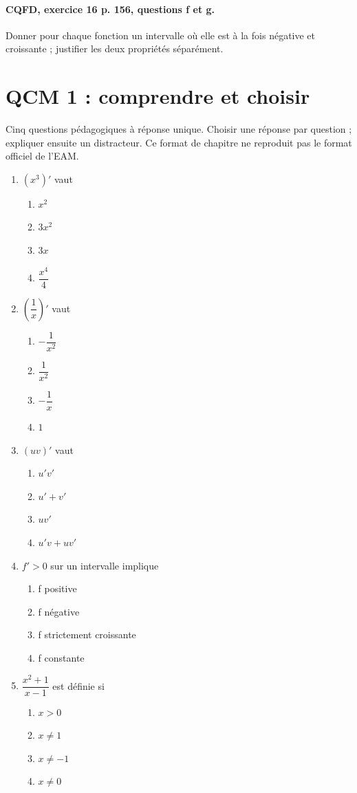 \paragraph{CQFD, exercice 16 p. 156, questions f et g.}\label{C06-M2} Donner pour chaque fonction un intervalle où elle est à la fois négative et croissante ; justifier les deux propriétés séparément.
\begingroup\small
\clearpage\section*{QCM 1 : comprendre et choisir}\label{C06-Q1}
Cinq questions pédagogiques à réponse unique. Choisir une réponse par question ; expliquer ensuite un distracteur. Ce format de chapitre ne reproduit pas le format officiel de l’EAM.
\begin{enumerate}
\item $(x^3)\prime$ vaut
\begin{enumerate}[label=\Alph*.,itemsep=2pt]
\item $x^2$
\item $3x^2$
\item $3x$
\item $\dfrac{x^4}{4}$
\end{enumerate}
\item $(\dfrac{1}{x})\prime $ vaut
\begin{enumerate}[label=\Alph*.,itemsep=2pt]
\item $-\dfrac{1}{x^2}$
\item $\dfrac{1}{x^2}$
\item $-\dfrac{1}{x}$
\item $1$
\end{enumerate}
\item $(uv)\prime$ vaut
\begin{enumerate}[label=\Alph*.,itemsep=2pt]
\item $u\prime v\prime$
\item $u\prime+v\prime$
\item $uv\prime$
\item $u\prime v+uv\prime$
\end{enumerate}
\item $f\prime>0$ sur un intervalle implique
\begin{enumerate}[label=\Alph*.,itemsep=2pt]
\item f positive
\item f négative
\item f strictement croissante
\item f constante
\end{enumerate}
\item $\dfrac{x^2+1}{x-1}$ est définie si
\begin{enumerate}[label=\Alph*.,itemsep=2pt]
\item $x>0$
\item $x\ne1$
\item $x\ne-1$
\item $x\ne0$
\end{enumerate}
\end{enumerate}
